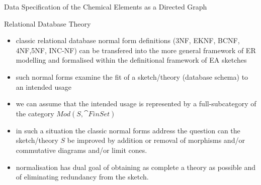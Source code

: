 
\newcommand{\attr}[1]{#1}
\renewcommand{\attr}[1]{\psframebox[linecolor=red,framearc=.1]{#1}}
\newcommand{\attrtype}[1]{#1}
\renewcommand{\attrtype}[1]{\psframebox[linecolor=blue,framearc=.1]{#1}}
\newcommand{\etype}[1]{#1}
\renewcommand{\etype}[1]{\psframebox[linecolor=red,framearc=.1]{#1}}

\newcommand{\CEsymboltype}[0]{varchar(2)}
\newcommand{\CEatomicnumbertype}{number(1,1000)}
\newcommand{\CEfloattype}{float}
\newcommand{\CEnametype}{varchar(64)}
\newcommand{\CEvalencynumbertype}{number(-7,7)}


\iffalse %
\begin{frame}{Definitions - Johnstone et al.}
\begin{definition}{Johnstone et al}
An \textit{EA sketch} is a sketch $\tuple{G,D,L,C}$ where $G$ is a directed graph, $D$ a set of diagrams in $G$, $L$ a set of finite cones and
$C$ a set of finite discrete cocones.
\end{definition}

If $S$ is an EA-sketch then the theory of $S$ is the lextensive category generated by $S$.

If $S$ is an EA sketch then a model of $S$ is a functor to the category of finite sets preserving finite limits and coproducts.
The category of models is denoted $Mod(S,\cat{FinSet})$.
\end{frame}
\fi

\begin{frame}{Data Specification of the Chemical Elements as a Directed Graph}
\scalebox{0.65}{

} 
\end{frame}

\iffalse %
\begin{frame}{Relational Database Theory}
\begin{itemize}
\item classic relational database normal form definitions ({\scriptsize 3NF, EKNF, BCNF, 4NF,5NF, INC-NF}) can be transfered into the more general framework
of ER modelling and formalised within the definitional framework of EA sketches

\item such normal forms  examine the fit of a sketch/theory (database schema) to an intended usage

\item we can assume that the intended usage is represented by a full-subcategory of the category $Mod(S,\cat{FinSet})$

\item in such a situation the classic normal forms address the question can the sketch/theory $S$ be improved by addition or removal of morphisms and/or commutative diagrams and/or limit cones.
\item normalisation has dual goal of obtaining as complete a theory as possible and of eliminating redundancy from the sketch.  
\end{itemize}
\end{frame}

